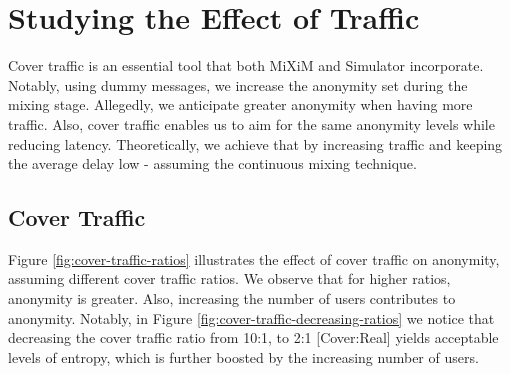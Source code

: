 \documentclass[logo,msc,cyber]{infthesis}   %
\begin{document}
\section{Studying the Effect of Traffic}

Cover traffic is an essential tool that both MiXiM and Simulator incorporate.
Notably, using dummy messages, we increase the anonymity set during the mixing
stage. Allegedly, we anticipate greater anonymity when having more traffic.
Also, cover traffic enables us to aim for the same anonymity levels while
reducing latency. Theoretically, we achieve that by increasing traffic and
keeping the average delay low - assuming the continuous mixing technique. 

\subsection{Cover Traffic}

Figure \ref{fig:cover-traffic-ratios} illustrates the effect of cover traffic on
anonymity, assuming different cover traffic ratios. We observe that for higher
ratios, anonymity is greater. Also, increasing the number of users contributes
to anonymity. Notably, in Figure \ref{fig:cover-traffic-decreasing-ratios} we
notice that decreasing the cover traffic ratio from 10:1,  to 2:1 [Cover:Real]
yields acceptable levels of entropy, which is further boosted by the increasing
number of users. 
\end{document}
